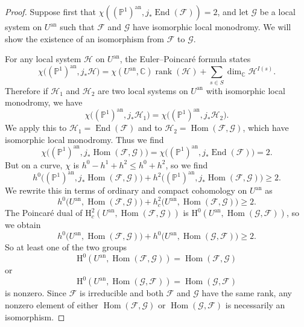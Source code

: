 \begin{proof}
Suppose first that
\(\chi((\mathbb{P}^1)^{\mathrm{an}},j_*\operatorname{End}(\mathcal{F}))=2\),
and let \(\mathcal{G}\) be a local system on \(U^{\mathrm{an}}\) such that
\(\mathcal{F}\) and \(\mathcal{G}\) have isomorphic local monodromy. We will
show the existence of an isomorphism from \(\mathcal{F}\) to \(\mathcal{G}\).

For any local system \(\mathcal{H}\) on \(U^{\mathrm{an}}\), the
Euler--Poincaré formula states
\[
  \chi\bigl((\mathbb{P}^1)^{\mathrm{an}},j_*\mathcal{H}\bigr)
  =
  \chi(U^{\mathrm{an}},\mathbb{C})\operatorname{rank}(\mathcal{H})
  +\sum_{s\in S}\dim_{\mathbb{C}}\mathcal{H}^{I(s)}.
\]
Therefore if \(\mathcal{H}_1\) and \(\mathcal{H}_2\) are two local systems on
\(U^{\mathrm{an}}\) with isomorphic local monodromy, we have
\[
  \chi\bigl((\mathbb{P}^1)^{\mathrm{an}},j_*\mathcal{H}_1\bigr)
  =
  \chi\bigl((\mathbb{P}^1)^{\mathrm{an}},j_*\mathcal{H}_2\bigr).
\]
We apply this to
\(\mathcal{H}_1=\operatorname{End}(\mathcal{F})\) and to
\(\mathcal{H}_2=\operatorname{Hom}(\mathcal{F},\mathcal{G})\), which have
isomorphic local monodromy. Thus we find
\[
  \chi\bigl((\mathbb{P}^1)^{\mathrm{an}},
    j_*\operatorname{Hom}(\mathcal{F},\mathcal{G})\bigr)
  =
  \chi\bigl((\mathbb{P}^1)^{\mathrm{an}},
    j_*\operatorname{End}(\mathcal{F})\bigr)=2.
\]
But on a curve, \(\chi\) is \(h^0-h^1+h^2\leq h^0+h^2\), so we find
\[
  h^0\bigl((\mathbb{P}^1)^{\mathrm{an}},
    j_*\operatorname{Hom}(\mathcal{F},\mathcal{G})\bigr)
  +
  h^2\bigl((\mathbb{P}^1)^{\mathrm{an}},
    j_*\operatorname{Hom}(\mathcal{F},\mathcal{G})\bigr)
  \geq 2.
\]
We rewrite this in terms of ordinary and compact cohomology on
\(U^{\mathrm{an}}\) as
\[
  h^0\bigl(U^{\mathrm{an}},\operatorname{Hom}(\mathcal{F},\mathcal{G})\bigr)
  +
  h^2_c\bigl(U^{\mathrm{an}},\operatorname{Hom}(\mathcal{F},\mathcal{G})\bigr)
  \geq 2.
\]
The Poincaré dual of
\(\mathrm{H}^2_c(U^{\mathrm{an}},\operatorname{Hom}(\mathcal{F},\mathcal{G}))\)
is
\(\mathrm{H}^0(U^{\mathrm{an}},\operatorname{Hom}(\mathcal{G},\mathcal{F}))\),
so we obtain
\[
  h^0\bigl(U^{\mathrm{an}},\operatorname{Hom}(\mathcal{F},\mathcal{G})\bigr)
  +
  h^0\bigl(U^{\mathrm{an}},\operatorname{Hom}(\mathcal{G},\mathcal{F})\bigr)
  \geq 2.
\]
So at least one of the two groups
\[
  \mathrm{H}^0(U^{\mathrm{an}},\operatorname{Hom}(\mathcal{F},\mathcal{G}))
  =
  \operatorname{Hom}(\mathcal{F},\mathcal{G})
\]
or
\[
  \mathrm{H}^0(U^{\mathrm{an}},\operatorname{Hom}(\mathcal{G},\mathcal{F}))
  =
  \operatorname{Hom}(\mathcal{G},\mathcal{F})
\]
is nonzero. Since \(\mathcal{F}\) is irreducible and both
\(\mathcal{F}\) and \(\mathcal{G}\) have the same rank, any nonzero element of
either \(\operatorname{Hom}(\mathcal{F},\mathcal{G})\) or
\(\operatorname{Hom}(\mathcal{G},\mathcal{F})\) is necessarily an isomorphism.


\end{proof}
